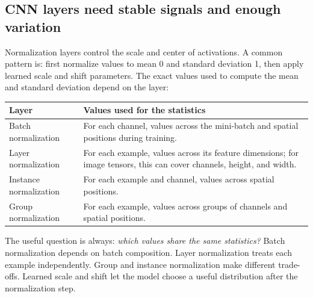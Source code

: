 \subsection{CNN layers need stable signals and enough variation}\label{04-visual-computing-ii-ch031-cnn-layers-need-stable-signals-and-enough-variation}

\hypertarget{04-visual-computing-ii-ch031-cnn-layers-need-stable-signals-and-enough-variation}{}

Normalization layers control the scale and center of activations. A common pattern is: first normalize values to mean 0 and standard deviation 1, then apply learned scale and shift parameters. The exact values used to compute the mean and standard deviation depend on the layer:

{\def\LTcaptype{none} %
\begin{longtable}[]{@{}
  >{\raggedright\arraybackslash}p{}
  >{\raggedright\arraybackslash}p{}@{}}
\toprule\noalign{}
\begin{minipage}[b]{\linewidth}\raggedright
Layer
\end{minipage} & \begin{minipage}[b]{\linewidth}\raggedright
Values used for the statistics
\end{minipage} \\
\midrule\noalign{}
\endhead
\bottomrule\noalign{}
\endlastfoot
Batch normalization & For each channel, values across the mini-batch and spatial positions during training. \\
Layer normalization & For each example, values across its feature dimensions; for image tensors, this can cover channels, height, and width. \\
Instance normalization & For each example and channel, values across spatial positions. \\
Group normalization & For each example, values across groups of channels and spatial positions. \\
\end{longtable}
}

The useful question is always: \emph{which values share the same statistics?} Batch normalization depends on batch composition. Layer normalization treats each example independently. Group and instance normalization make different trade-offs. Learned scale and shift let the model choose a useful distribution after the normalization step.

